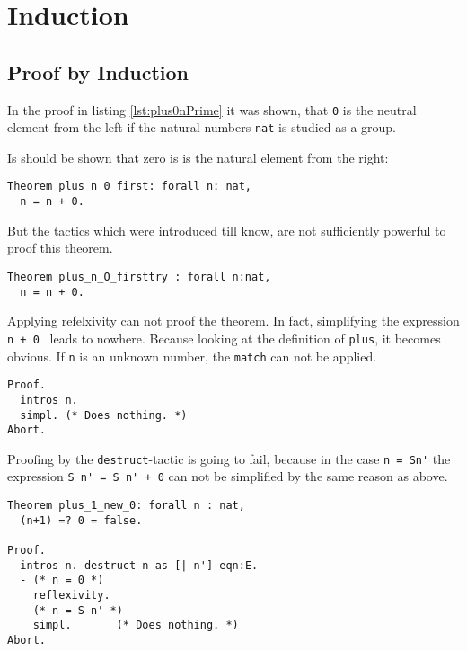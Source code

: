 \section{Induction}

\subsection{Proof by Induction}
In the proof in listing \ref{lst:plus0nPrime} it was shown, 
that \lstinline!0! is the neutral element from the left if the natural numbers \lstinline!nat! is studied as a group. 

Is should be shown that zero is is the natural element from the right:
\begin{lstlisting}[caption = \lstinline!plus_n_0_first!, label= lst:plus_n_0_first]
Theorem plus_n_0_first: forall n: nat,
  n = n + 0.  
\end{lstlisting}

But the tactics which were introduced till know, are not sufficiently powerful to proof this theorem.

\begin{lstlisting}[caption = \lstinline!plus_n_O_firsttry!, label=lst:plus_n_0_firsttry] 
Theorem plus_n_O_firsttry : forall n:nat,
  n = n + 0.
\end{lstlisting}

Applying refelxivity can not proof the theorem. In fact, simplifying the expression \lstinline!n + 0 ! leads to nowhere.
Because looking at the definition of \lstinline!plus!, it becomes obvious.
If \lstinline!n! is an unknown number, the  \lstinline!match! can not be applied.
  
\begin{lstlisting}[caption= \lstinline!Proof! of \lstinline!plus_n_0_firsttry!, label = lst:proof_of_plus_n_0_firsttry]
Proof.
  intros n.
  simpl. (* Does nothing. *)
Abort.
\end{lstlisting}

Proofing by the \lstinline!destruct!-tactic is going to fail, because in the case \lstinline!n = Sn'! the expression \lstinline!S n' = S n' + 0! can not be simplified by the same reason as above.
\begin{lstlisting}[caption = \lstinline!plus_1_new_0!, label = lst:Theorem_plus_1_new_0]
Theorem plus_1_new_0: forall n : nat,
  (n+1) =? 0 = false. 
 
Proof.
  intros n. destruct n as [| n'] eqn:E.
  - (* n = 0 *)
    reflexivity. 
  - (* n = S n' *)
    simpl.       (* Does nothing. *)
Abort.
\end{lstlisting}


